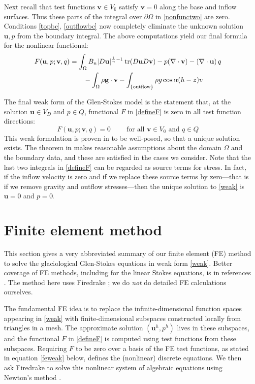 \documentclass[letterpaper,final,12pt,reqno]{amsart}
\newcommand{\trace}{\operatorname{tr}}
\newcommand{\bu}{\mathbf{u}}
\newcommand{\bv}{\mathbf{v}}
\begin{document}
Next recall that test functions $\bv\in V_0$ satisfy $\bv=0$ along the base and inflow surfaces.  Thus these parts of the integral over $\partial\Omega$ in \eqref{nonfunctwo} are zero.  Conditions \eqref{topbc}, \eqref{outflowbc} now completely eliminate the unknown solution $\bu,p$ from the boundary integral.  The above computations yield our final formula for the nonlinear functional:
\begin{align}
F(\bu,p;\bv,q) &= \int_\Omega B_n |D\bu|^{\frac{1}{n} - 1} \trace(D\bu D\bv) - p (\nabla \cdot \bv) - \left(\nabla \cdot \bu\right) q \label{defineF} \\
    &\qquad  - \int_\Omega \rho \mathbf{g} \cdot \bv - \int_{\{\text{outflow}\}} \rho g \cos\alpha (h-z) v  \notag
\end{align}

The final weak form of the Glen-Stokes model is the statement that, at the solution $\bu\in V_D$ and $p\in Q$, functional $F$ in \eqref{defineF} is zero in all test function directions:
\begin{equation}
F(\bu,p;\bv,q) = 0 \qquad \text{ for all } \bv\in V_0 \text{ and } q\in Q  \label{weak}
\end{equation}
This weak formulation is proven in \cite[Theorem 3.8]{JouvetRappaz2011} to be well-posed, so that a unique solution exists.  The theorem in \cite{JouvetRappaz2011} makes reasonable assumptions about the domain $\Omega$ and the boundary data, and these are satisfied in the cases we consider.  Note that the last two integrals in \eqref{defineF} can be regarded as source terms for stress.  In fact, if the inflow velocity is zero and if we replace these source terms by zero---that is if we remove gravity and outflow stresses---then the unique solution to \eqref{weak} is $\bu=0$ and $p=0$.


\section{Finite element method} \label{sec:femethod}

This section gives a very abbreviated summary of our finite element (FE) method to solve the glaciological Glen-Stokes equations in weak form \eqref{weak}.  Better coverage of FE methods, including for the linear Stokes equations, is in references \cite{Braess2007,Bueler2021,Elmanetal2014}.  The method here uses Firedrake \cite{Rathgeberetal2016}; we do \emph{not} do detailed FE calculations ourselves.

The fundamental FE idea is to replace the infinite-dimensional function spaces appearing in \eqref{weak} with finite-dimensional subspaces constructed locally from triangles in a mesh.  The approximate solution $(\bu^h,p^h)$ lives in these subspaces, and the functional $F$ in \eqref{defineF} is computed using test functions from these subspaces.  Requiring $F$ to be zero over a basis of the FE test functions, as stated in equation \eqref{feweak} below, defines the (nonlinear) discrete equations.  We then ask Firedrake to solve this nonlinear system of algebraic equations using Newton's method \cite{Bueler2021}.
\end{document}
